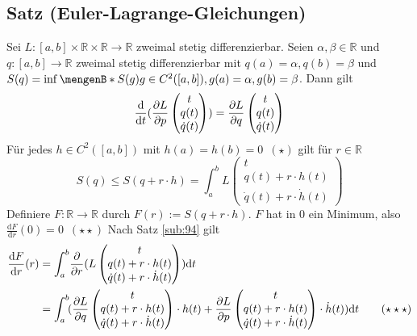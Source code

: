 \subsection{Satz (Euler-Lagrange-Gleichungen)} %
\label{sub:102}
Sei $L : [a,b] \times \mathds{R} \times \mathds{R} \to \mathds{R}$ zweimal stetig differenzierbar. Seien $\alpha, \beta \in \mathds{R}$ und $q : [a,b] \to \mathds{R}$
zweimal stetig differenzierbar mit $q(a)=\alpha, q(b)=\beta$ und $S(q) = \inf \set[S(g)]{g \in C^2([a,b]) , g(a)=\alpha, g(b)=\beta} $. Dann gilt 
\[
	  \frac{\mathrm{d}}{\mathrm{d} t} (\frac{{\partial L}}{{\partial p}}  \begin{pmatrix}
		t \\ q(t) \\ \dot q(t)
	\end{pmatrix}) = \frac{{\partial L}}{{\partial q}}   \begin{pmatrix}
		t \\ q(t) \\ \dot q(t)
	\end{pmatrix}
\]
Für jedes $h \in C^2([a,b])$ mit $h(a)=h(b)=0 \enspace(\star)$ gilt für $r \in \mathds{R}$
\[
	S(q) \le S(q + r \cdot h) = \int_{a} ^{b} \! L \begin{pmatrix}
		t \\ q(t) + r \cdot h(t) \\ \dot q(t) + r \cdot \dot h(t)
	\end{pmatrix}
\]
Definiere $F : \mathds{R} \to \mathds{R}$ durch $F(r) := S(q + r \cdot h)$. $F$ hat in $0$ ein Minimum, also $\frac{\mathrm{d}F}{\mathrm{d} r}(0)=0  \enspace(\star \star)$
Nach Satz \ref{sub:94} gilt 
\begin{align*}
	\frac{\mathrm{d} F}{\mathrm{d} r} (r) &= \int_{a} ^{b} \!  \frac{{\partial }}{{\partial r}}  (L \begin{pmatrix}
		t \\ q(t) + r \cdot h(t) \\ \dot q(t) + r \cdot \dot h(t)
	\end{pmatrix}) \mathrm{d}t \\ &= \int_{a} ^{b} \! (\frac{{\partial L}}{{\partial q}}   \begin{pmatrix}
		t \\ q(t) + r \cdot h(t) \\ \dot q(t) + r \cdot \dot h(t)
	\end{pmatrix} \cdot h(t) + \frac{{\partial L}}{{\partial p}}  \begin{pmatrix}
		t \\ q(t) + r \cdot h(t) \\ \dot q(t) + r \cdot \dot h(t)
	\end{pmatrix} \cdot  \dot h (t) )  \mathrm{d}t \tag{$\star\star\star$}
\end{align*}
